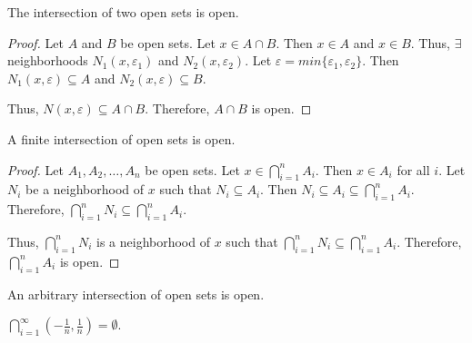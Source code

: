 \begin{theorem}{}{}
    The intersection of two open sets is open.
\end{theorem}
\begin{proof}
    Let $A$ and $B$ be open sets. Let $x \in A \cap B$. Then $x \in A$ and $x \in B$. Thus, $\exists$ neighborhoods $N_1(x, \varepsilon_1)$ and $N_2(x, \varepsilon_2)$. Let $\varepsilon = min\{\varepsilon_1, \varepsilon_2\}$. Then $N_1(x, \varepsilon) \subseteq A$ and $N_2(x, \varepsilon) \subseteq B$. 
    
    Thus, $N(x, \varepsilon) \subseteq A \cap B$. Therefore, $A \cap B$ is open.
\end{proof}

\begin{theorem}{}{}
    A finite intersection of open sets is open.
\end{theorem}
\begin{proof}
    Let $A_1, A_2, \ldots, A_n$ be open sets. Let $x \in \bigcap_{i=1}^n A_i$. Then $x \in A_i$ for all $i$. Let $N_i$ be a neighborhood of $x$ such that $N_i \subseteq A_i$. Then $N_i \subseteq A_i \subseteq \bigcap_{i=1}^n A_i$. Therefore, $\bigcap_{i=1}^n N_i \subseteq \bigcap_{i=1}^n A_i$. 
    
    Thus, $\bigcap_{i=1}^n N_i$ is a neighborhood of $x$ such that $\bigcap_{i=1}^n N_i \subseteq \bigcap_{i=1}^n A_i$. Therefore, $\bigcap_{i=1}^n A_i$ is open.
\end{proof}

\begin{theorem}{}{}
    An arbitrary intersection of open sets is open.
\end{theorem}
\begin{note}
    $\bigcap_{i=1}^\infty (-\frac{1}{n}, \frac{1}{n}) = \emptyset$.
\end{note}